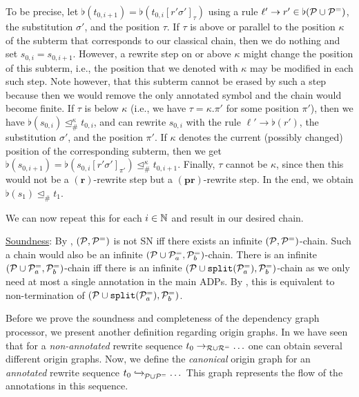 \begin{myproof}
    To be precise, let
    $\flat(t_{0,i+1}) = \flat(t_{0,i}[r' \sigma']_{\tau})$ using a rule $\ell' \to r' \in \flat(\mathcal{P} \cup
    \mathcal{P}^{=})$, the substitution $\sigma'$, and the position $\tau$.
    If $\tau$ is above or parallel to the position $\kappa$ of the
    subterm that corresponds to our
    classical chain, then we do nothing and set $s_{0,i} =
    s_{0,i+1}$.
    However, a rewrite step on or above $\kappa$ might change the position of this subterm,
    i.e., the position that we denoted with $\kappa$ may be modified in each such step. Note
    however, that this subterm cannot be erased by such a step because then we would remove
    the only annotated symbol and the chain would become finite.
    If $\tau$ is below $\kappa$ (i.e., we have $\tau = \kappa.\pi'$ for some position $\pi'$), then we have $\flat(s_{0,i}) \trianglelefteq_{\#}^{\kappa} t_{0,i}$, and can rewrite $s_{0,i}$
    with the rule $\ell' \to \flat(r')$, the substitution $\sigma'$, and the position $\pi'$.
    If $\kappa$ denotes the current (possibly changed) position of the corresponding subterm,
    then
    we get $\flat(s_{0,i+1}) = \flat(s_{0,i}[r' \sigma']_{\pi'}) \trianglelefteq_{\#}^{\kappa}
    t_{0,i+1}$.
    Finally, $\tau$ cannot be $\kappa$, since then this would not be a $(\mathbf{r})$-rewrite step but a $(\mathbf{pr})$-rewrite step.
    In the end, we obtain $\flat(s_1) \trianglelefteq_{\#} t_1$.

    We can now repeat this for each $i \in \mathbb{N}$ and result in our desired chain.
\end{myproof}

\DerelProcTwo*

\begin{myproof}
    \underline{Soundness}:
    By , $(\mathcal{P},
    \mathcal{P}^{=})$ is not SN iff there exists an infinite $(\mathcal{P}, \mathcal{P}^{=})$-chain. Such a
    chain would also be an infinite $(\mathcal{P}\cup \mathcal{P}^{=}_a, \mathcal{P}^{=}_b)$-chain.
    There is an infinite $(\mathcal{P}\cup \mathcal{P}^{=}_a, \mathcal{P}^{=}_b)$-chain iff there is an infinite
    $(\mathcal{P}\cup \mathtt{split}(\mathcal{P}^{=}_a), \mathcal{P}^{=}_b)$-chain as we only need at most a single annotation in the main ADPs. 
    By , this is
    equivalent to non-termination of $(\mathcal{P}\cup \mathtt{split}(\mathcal{P}^{=}_a), \mathcal{P}^{=}_b)$.
\end{myproof}

Before we prove the soundness and completeness of the dependency graph processor, we
present
another definition regarding origin graphs.
In  we 
have seen that for a \emph{non-annotated} rewrite sequence $t_0 \to_{\mathcal{R} \cup \mathcal{R}^{=}} \ldots$ one
can obtain
several different origin graphs.
Now, we define the \emph{canonical} origin graph for an \emph{annotated} rewrite sequence
$t_0 \mathrel{ \xhookrightarrow{{}_{\scriptstyle }} \!\!{}^{}_{\mathcal{P} \cup \mathcal{P}^{=}} } \ldots$\
This graph 
represents the flow of the annotations in this sequence.

